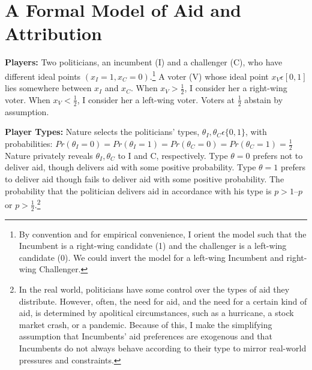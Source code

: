 \documentclass[12pt]{paper}
\begin{document}
\section{A Formal Model of Aid and Attribution}
\textbf{Players:} Two politicians, an incumbent (I) and a challenger (C), who have different ideal points $(x_I=1, x_C=0)$.\footnote{By convention and for empirical convenience, I orient the model such that the Incumbent is a right-wing candidate (1) and the challenger is a left-wing candidate (0). We could invert the model for a left-wing Incumbent and right-wing Challenger.}  A voter (V) whose ideal point $x_V \epsilon [0,1]$ lies somewhere between $x_I$ and $x_C.$ When $x_V > \frac{1}{2}$, I consider her a right-wing voter. When $x_V < \frac{1}{2}$, I consider her a left-wing voter. Voters at $\frac{1}{2}$ abstain by assumption.

\textbf{Player Types:} Nature selects the politicians’ types, $\theta_I, \theta_C \epsilon \{0,1\}$, with probabilities: $Pr(\theta_I=0)=Pr(\theta_I=1)=Pr(\theta_C=0)=Pr(\theta_C=1)= \frac{1}{2}$ Nature privately reveals $\theta_I,\theta_C$ to I and C, respectively. Type $\theta=0$ prefers not to deliver aid, though delivers aid with some positive probability. Type $\theta=1$ prefers to deliver aid though fails to deliver aid with some positive probability. The probability that the politician delivers aid in accordance with his type is $p > 1 – p$ or $p > \frac{1}{2}$.\footnote{In the real world, politicians have some control over the types of aid they distribute. However, often, the need for aid, and the need for a certain kind of aid, is determined by apolitical circumstances, such as a hurricane, a stock market crash, or a pandemic. Because of this, I make the simplifying assumption that Incumbents' aid preferences are exogenous and that Incumbents do not always behave according to their type to mirror real-world pressures and constraints.}
\end{document}
